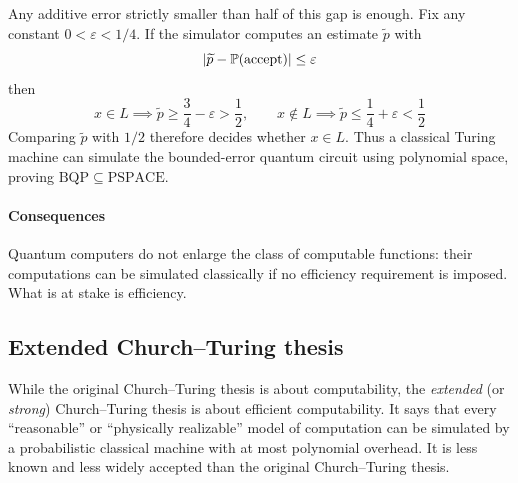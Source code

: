 Any additive error strictly smaller than half of this gap is enough.
Fix any constant
\(
0<\varepsilon<1/4
\).
If the simulator computes an estimate \(\widetilde p\) with
\[
\left|\widetilde p-\operatorname{\mathbb{P}}(\text{accept})\right|
\le
\varepsilon
\]
then
\[
x\in L
\implies
\widetilde p\ge \frac34-\varepsilon>\frac12,
\qquad
x\notin L
\implies
\widetilde p\le \frac14+\varepsilon<\frac12
\]
Comparing \(\widetilde p\) with \(1/2\) therefore decides whether \(x\in L\).
Thus a classical Turing machine can simulate the bounded-error quantum circuit using polynomial space, proving
\(
\mathrm{BQP}
\subseteq
\mathrm{PSPACE}
\).


\paragraph{Consequences}
Quantum computers do not enlarge the class of computable functions:
their computations can be simulated classically if no efficiency requirement is imposed.
What is at stake is efficiency.

\pagebreak[3]


\subsection{Extended Church--Turing thesis}

While the original Church--Turing thesis is about computability, the \emph{extended} (or \emph{strong}) Church--Turing thesis is about efficient computability.
It says that every ``{reasonable}'' or ``{physically realizable}'' model of computation can be simulated by a probabilistic classical machine with at most polynomial overhead.
It is less known and less widely accepted than the original Church--Turing thesis.


